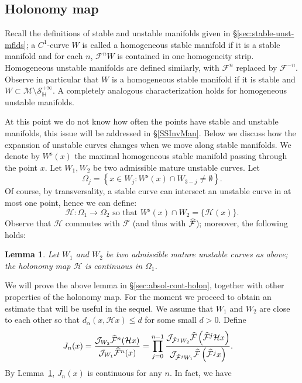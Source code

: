 \documentclass[10pt]{amsart}
\newtheorem{lemm}[theo]{Lemma}\newtheorem{prop}[theo]{Proposition}\newtheorem{coro}[theo]{Corollary}\newtheorem{conj}[theo]{Conjecture}
\theoremstyle{definition}\newtheorem{defi}[theo]{Definition}\newtheorem{rema}[theo]{Remark}\newtheorem{exam}[theo]{Example}\newtheorem{exem}[theo]{Example}\newtheorem{nota}[theo]{Notation}
\newcommand{\stable}{\text{s}}
\newcommand{\homo}{\mathbb{H}}
\newcommand{\cm}{\mathcal{F}}
\newcommand{\hol}{\mathcal{H}}
\newcommand{\csp}{\mathcal{M}}
\newcommand{\cmp}{\hat\cm}
\newcommand{\Ws}{W^{\stable}}
\newcommand{\singPrivate}{\mathcal{S}}
\newcommand{\hsing}[1]{{\singPrivate}_\homo^{#1}}
\newcommand{\jac}[1]{\mathcal{J}_{#1}}
\let\oldhat\hat
\renewcommand*{\hat}[1]{\mathchoice{\widehat{#1}}{\widehat{#1}}{\oldhat{#1}}{\oldhat{#1}}}
\begin{document}
\subsection{Holonomy map}\label{SSHolonomy}
Recall the definitions of stable and unstable manifolds given in \S\ref{sec:stable-unst-mflds}; a $C^1$-curve $W$ is called a homogeneous stable manifold if it is a stable manifold and for each $n$, $\cm^n W$ is contained in one homogeneity strip. Homogeneous unstable manifolds are defined similarly, with $\cm^{n}$ replaced by $\cm^{-n}$. Observe in particular that $W$ is a homogeneous stable manifold if it is stable and $W\subset \csp\setminus\hsing{+\infty}$. A completely analogous characterization holds for homogeneous unstable manifolds.

At this point we do not know how often the points have stable and unstable manifolds, this issue will be addressed in
\S\ref{SSInvMan}. Below we discuss how the expansion of unstable curves changes when we move along stable manifolds. We denote by $\Ws(x)$ the maximal homogeneous stable manifold passing through the point $x$. Let $W_1, W_2$ be two admissible mature unstable curves. Let
\begin{equation}\label{DomainRangeHol}
\Omega_j =\left\{x\in W_j: \Ws(x)\cap W_{3-j}\neq \emptyset\right\}.
\end{equation}
Of course, by transversality, a stable curve can intersect an unstable curve in at most one point, hence we can define:
\begin{equation}\label{DefHolonomy}
\hol:\Omega_1\to\Omega_2 \text{ so that } \Ws(x)\cap W_2 = \{\hol(x)\}.
\end{equation}
Observe that $\hol$ commutes with $\cm$ (and thus with $\cmp$); moreover, the following holds:


\begin{lemm}\label{lem:holonomy-continuity}
Let $W_{1}$ and $W_{2}$ be two admissible mature unstable curves as above; the holonomy map $\hol$ is continuous in $\Omega_{1}$.
\end{lemm} We will prove the above lemma in \S\ref{sec:absol-cont-holon}, together with other properties of the holonomy map. For the moment we proceed to obtain an estimate that will be useful in the sequel. We assume that $W_1$ and $W_2$ are close to each other so that $d_\alpha(x, \hol x)\leq d$ for some small $d > 0$. Define
\begin{align}\label{Jak}
J_n(x)& = \frac{\jac{W_{2}}\cmp^{n}(\hol x)}{\jac{W_{1}}\cmp^{n}(x)} = \prod_{j=0}^{n-1} \frac{\jac{\cmp^{j}W_{2}}\cmp\left(\cmp^j \hol x\right)}{\jac{\cmp^{j}W_{1}}\cmp\left(\cmp^j x\right)}.
\end{align}
By Lemma~\ref{lem:holonomy-continuity}, $J_{n}(x)$ is continuous for any $n$. In fact, we have
\end{document}
